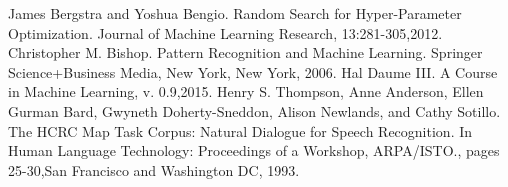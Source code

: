 \documentclass[twoside,11pt]{article}
\begin{document}
\begin{thebibliography}{9} 
 James Bergstra and Yoshua Bengio. Random Search for Hyper-Parameter Optimization. Journal of Machine Learning Research, 13:281-305,2012.
 Christopher M. Bishop. Pattern Recognition and Machine Learning. Springer Science+Business Media, New York, New York, 2006.
 Hal Daume III. A Course in Machine Learning, v. 0.9,2015.
 Henry S. Thompson, Anne Anderson, Ellen Gurman Bard, Gwyneth Doherty-Sneddon, Alison Newlands, and Cathy Sotillo. 
The HCRC Map Task Corpus: Natural Dialogue for Speech Recognition. 
In Human Language Technology: Proceedings of a Workshop, ARPA/ISTO., pages 25-30,San Francisco and Washington DC, 1993.
 \end{thebibliography}
\end{document}
